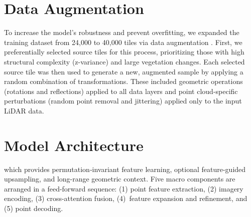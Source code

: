 \documentclass[12pt]{report}
\begin{document}
\section{Data Augmentation}
To increase the model's robustness and prevent overfitting, we expanded the training dataset from 24,000 to 40,000 tiles via data augmentation \cite{zhu2024advancements, shorten2019survey}. First, we preferentially selected source tiles for this process, prioritizing those with high structural complexity (z-variance) and large vegetation changes. Each selected source tile was then used to generate a new, augmented sample by applying a random combination of transformations. These included geometric operations (rotations and reflections) applied to all data layers and point cloud-specific perturbations (random point removal and jittering) applied only to the input LiDAR data.


\section{Model Architecture}
\label{sec:architecture}
 which provides permutation‐invariant feature learning, optional feature-guided upsampling, and long-range geometric context. Five macro components are arranged in a feed-forward sequence: (1) point feature extraction, (2) imagery encoding, (3) cross-attention fusion, (4)~feature expansion and refinement, and (5) point decoding.
\end{document}
